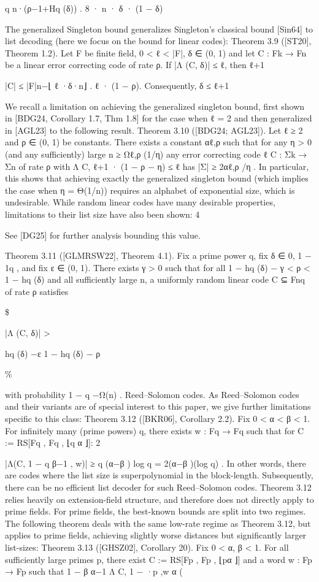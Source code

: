 \documentclass[11pt]{article}
\begin{document}
q n·(ρ−1+Hq (δ))
.
8 · n · δ · (1 − δ)

The generalized Singleton bound generalizes Singleton’s classical bound [Sin64] to list decoding
(here we focus on the bound for linear codes):
Theorem 3.9 ([ST20], Theorem 1.2). Let F be finite field, 0 < ℓ < |F|, δ ∈ (0, 1) and let C : Fk → Fn
be a linear error correcting code of rate ρ. If |Λ (C, δ)| ≤ ℓ, then
ℓ+1

|C| ≤ |F|n−⌊ ℓ ·δ·n⌋ .
ℓ
· (1 − ρ).
Consequently, δ ≤ ℓ+1

We recall a limitation on achieving the generalized singleton bound, first shown in [BDG24,
Corollary 1.7, Thm 1.8] for the case when ℓ = 2 and then generalized in [AGL23] to the following
result.
Theorem 3.10 ([BDG24; AGL23]). Let ℓ ≥ 2 and ρ ∈ (0, 1) be constants. There exists a constant
αℓ,ρ such that for any η > 0 (and any sufficiently) large n ≥ Ωℓ,ρ (1/η) any error correcting code
ℓ
C : Σk → Σn of rate ρ with Λ C, ℓ+1
· (1 − ρ − η) ≤ ℓ has |Σ| ≥ 2αℓ,ρ /η .
In particular, this shows that achieving exactly the generalized singleton bound (which implies
the case when η = Θ(1/n)) requires an alphabet of exponential size, which is undesirable.
While random linear codes have many desirable properties, limitations to their list size have
also been shown:
4

See [DG25] for further analysis bounding this value.

Theorem 3.11 ([GLMRSW22], Theorem 4.1). Fix a prime power q, fix δ ∈ 0, 1 − 1q , and fix
ε ∈ (0, 1). There exists γ > 0 such that for all 1 − hq (δ) − γ < ρ < 1 − hq (δ) and all sufficiently
large n, a uniformly random linear code C ⊆ Fnq of rate ρ satisfies


\$

|Λ (C, δ)| >

hq (δ)
−ε
1 − hq (δ) − ρ

\%

with probability 1 − q −Ω(n) .
Reed–Solomon codes. As Reed–Solomon codes and their variants are of special interest to this
paper, we give further limitations specific to this class:
Theorem 3.12 ([BKR06], Corollary 2.2). Fix 0 < α < β < 1. For infinitely many (prime powers)
q, there exists w : Fq → Fq such that for C := RS[Fq , Fq , ⌊q α ⌋]:
2



|Λ(C, 1 − q β−1 , w)| ≥ q (α−β ) log q = 2(α−β )(log q) .
In other words, there are codes where the list size is superpolynomial in the block-length.
Subsequently, there can be no efficient list decoder for such Reed–Solomon codes.
Theorem 3.12 relies heavily on extension-field structure, and therefore does not directly apply
to prime fields. For prime fields, the best-known bounds are split into two regimes. The following
theorem deals with the same low-rate regime as Theorem 3.12, but applies to prime fields, achieving
slightly worse distances but significantly larger list-sizes:
Theorem 3.13 ([GHSZ02], Corollary 20). Fix 0 < α, β < 1. For all sufficiently large primes p,
there exist C := RS[Fp , Fp , ⌊pα ⌋] and a word w : Fp → Fp such that
1 − β α−1
Λ C, 1 −
·p
,w
α
(
\end{document}
